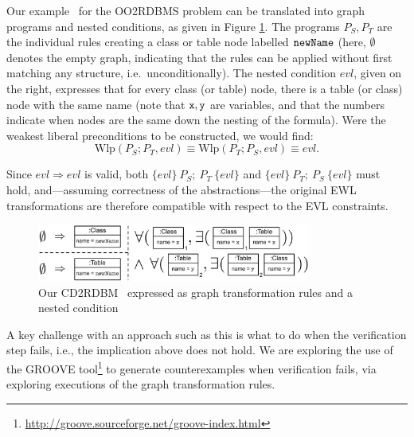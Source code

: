 Our example \BX\ for the OO2RDBMS problem can be translated into graph programs and nested conditions, as given in Figure \ref{fig:ex-program-constraints}. The programs $P_S,P_T$ are the individual rules creating a class or table node labelled $\tt newName$ (here, $\emptyset$ denotes the empty graph, indicating that the rules can be applied without first matching any structure, i.e.\ unconditionally). The nested condition $evl$, given on the right, expresses that for every class (or table) node, there is a table (or class) node with the same name (note that $\tt x,y$ are variables, and that the numbers indicate when nodes are the same down the nesting of the formula). Were the weakest liberal preconditions to be constructed, we would find:
	\[ \text{Wlp}(P_S;P_T,evl) \equiv \text{Wlp}(P_T;P_S,evl) \equiv evl. \]
	
	\noindent Since $evl \Rightarrow evl$ is valid, both $\{evl\}\ P_S;\ P_T\ \{evl\}$ and $\{evl\}\ P_T;\ P_S\ \{evl\}$ must hold, and---assuming correctness of the abstractions---the original EWL transformations are therefore compatible with respect to the EVL constraints.
	
	\begin{figure}[htb]
\vspace*{-10pt}
		\centering
		\includegraphics[width=0.8\textwidth]{ex-program-constraints.pdf}
		\caption{Our CD2RDBM \BX\ expressed as graph transformation rules and a nested condition}
\vspace*{-20pt}
		\label{fig:ex-program-constraints}
	\end{figure}

A key challenge with an approach such as this is what to do when the verification step fails, i.e., the implication above does not hold. We are exploring the use of the GROOVE tool\footnote{\url{http://groove.sourceforge.net/groove-index.html}} to generate counterexamples when verification fails, via exploring executions of the graph transformation rules.
